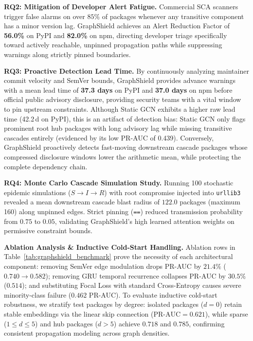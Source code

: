\documentclass[sigconf,screen]{acmart}
\begin{document}
\noindent\textbf{RQ2: Mitigation of Developer Alert Fatigue.} Commercial SCA scanners trigger false alarms on over $85\%$ of packages whenever any transitive component has a minor version lag. GraphShield achieves an Alert Reduction Factor of \textbf{56.0\%} on PyPI and \textbf{82.0\%} on npm, directing developer triage specifically toward actively reachable, unpinned propagation paths while suppressing warnings along strictly pinned boundaries.

\noindent\textbf{RQ3: Proactive Detection Lead Time.} By continuously analyzing maintainer commit velocity and SemVer bounds, GraphShield provides advance warnings with a mean lead time of \textbf{37.3 days} on PyPI and \textbf{37.0 days} on npm before official public advisory disclosure, providing security teams with a vital window to pin upstream constraints. Although Static GCN exhibits a higher raw lead time (42.2\,d on PyPI), this is an artifact of detection bias: Static GCN only flags prominent root hub packages with long advisory lag while missing transitive cascades entirely (evidenced by its low PR-AUC of 0.439). Conversely, GraphShield proactively detects fast-moving downstream cascade packages whose compressed disclosure windows lower the arithmetic mean, while protecting the complete dependency chain.

\noindent\textbf{RQ4: Monte Carlo Cascade Simulation Study.} Running 100 stochastic epidemic simulations ($S \to I \to R$) with root compromise injected into \texttt{urllib3} revealed a mean downstream cascade blast radius of $122.0$ packages (maximum 160) along unpinned edges. Strict pinning (\texttt{==}) reduced transmission probability from $0.75$ to $0.05$, validating GraphShield's high learned attention weights on permissive constraint bounds.

\noindent\textbf{Ablation Analysis \& Inductive Cold-Start Handling.} Ablation rows in Table~\ref{tab:graphshield_benchmark} prove the necessity of each architectural component: removing SemVer edge modulation drops PR-AUC by $21.4\%$ ($0.740 \to 0.582$); removing GRU temporal recurrence collapses PR-AUC by $30.5\%$ ($0.514$); and substituting Focal Loss with standard Cross-Entropy causes severe minority-class failure ($0.462$ PR-AUC). To evaluate inductive cold-start robustness, we stratify test packages by degree: isolated packages ($d=0$) retain stable embeddings via the linear skip connection ($\text{PR-AUC} = 0.621$), while sparse ($1 \le d \le 5$) and hub packages ($d > 5$) achieve $0.718$ and $0.785$, confirming consistent propagation modeling across graph densities.
\end{document}
